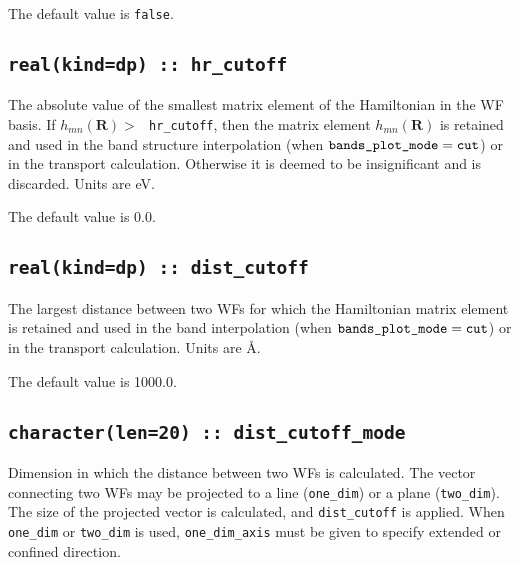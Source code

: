 The default value is {\tt false}.


\subsection[hr\_cutoff]{\tt real(kind=dp) :: hr\_cutoff}

The absolute value of the smallest matrix element of the
Hamiltonian in the WF basis.
If $h_{mn}(\mathbf{R})>\:${\tt
  hr\_cutoff}, then the matrix element
$h_{mn}(\mathbf{R})$ is retained and used in
the band structure interpolation (when $\verb#bands_plot_mode#=\verb#cut#$)
or in the transport calculation.
Otherwise it is deemed to be insignificant
and is discarded. Units are eV.


The default value is 0.0.

\subsection[dist\_cutoff]{\tt real(kind=dp) :: dist\_cutoff}

The largest distance between two WFs for which
the Hamiltonian matrix element is retained and used in
the band interpolation (when $\verb#bands_plot_mode#=\verb#cut#$)
or in the transport calculation. Units are \AA.

The default value is 1000.0.

\subsection[dist\_cutoff\_mode]{\tt character(len=20) :: dist\_cutoff\_mode}

Dimension in which the distance between two WFs is calculated.
The vector connecting two WFs may be projected
to a line (\verb#one_dim#) or a plane (\verb#two_dim#).
The size of the projected vector
is calculated, and \verb#dist_cutoff# is applied.
When \verb#one_dim# or \verb#two_dim#
is used, \verb#one_dim_axis# must be given
to specify extended or confined direction.


